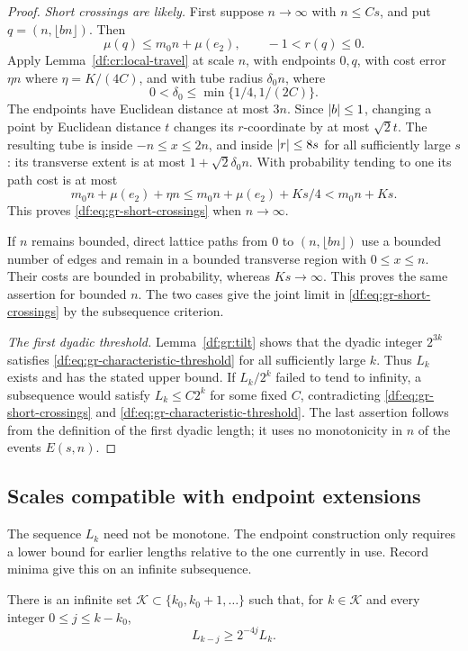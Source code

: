\begin{proof}
\emph{Short crossings are likely.}
First suppose $n\to\infty$ with $n\leq Cs$, and put
$q=(n,\lfloor bn\rfloor)$. Then
\[
 \mu(q)\leq m_0n+\mu(e_2),\qquad -1<r(q)\leq0.
\]
Apply Lemma~\ref{df:cr:local-travel} at scale $n$, with endpoints $0,q$,
with cost error $\eta n$ where $\eta=K/(4C)$, and with tube radius
$\delta_0n$, where
\[
 0<\delta_0\leq\min\{1/4,1/(2C)\}.
\]
The endpoints have Euclidean distance at most $3n$. Since
$\left\lvert b\right\rvert\leq1$, changing a point by Euclidean distance $t$ changes its
$r$-coordinate by at most $\sqrt2t$. The resulting tube is inside
$-n\leq x\leq2n$, and inside $\left\lvert r\right\rvert\leq8s$ for all sufficiently large
$s$: its transverse extent is at most $1+\sqrt2\delta_0n$. With
probability tending to one its path cost is at most
\[
 m_0n+\mu(e_2)+\eta n
 \leq m_0n+\mu(e_2)+Ks/4
 <m_0n+Ks.
\]
This proves \eqref{df:eq:gr-short-crossings} when $n\to\infty$.

If $n$ remains bounded, direct lattice paths from $0$ to
$(n,\lfloor bn\rfloor)$ use a bounded number of edges and remain in a
bounded transverse region with $0\leq x\leq n$. Their costs are bounded
in probability, whereas $Ks\to\infty$. This proves the same assertion
for bounded $n$. The two cases give the joint limit in
\eqref{df:eq:gr-short-crossings} by the subsequence criterion.

\emph{The first dyadic threshold.}
Lemma~\ref{df:gr:tilt} shows that the dyadic integer $2^{3k}$ satisfies
\eqref{df:eq:gr-characteristic-threshold} for all sufficiently large $k$.
Thus $L_k$ exists and has the stated upper bound. If $L_k/2^k$ failed to
tend to infinity, a subsequence would satisfy $L_k\leq C2^k$ for some
fixed $C$, contradicting \eqref{df:eq:gr-short-crossings} and
\eqref{df:eq:gr-characteristic-threshold}. The last assertion follows from
the definition of the first dyadic length; it uses no monotonicity in
$n$ of the events $E(s,n)$.
\end{proof}

\subsection{Scales compatible with endpoint extensions}

The sequence $L_k$ need not be monotone. The endpoint construction
only requires a lower bound for earlier lengths relative to the one
currently in use. Record minima give this on an infinite subsequence.

\begin{lemma}\label{df:gr:record-scales}
There is an infinite set $\mathcal K\subset\{k_0,k_0+1,\ldots\}$ such that,
for $k\in\mathcal K$ and every integer $0\leq j\leq k-k_0$,
\begin{equation}\label{df:eq:gr-record-comparison}
 L_{k-j}\geq2^{-4j}L_k.
\end{equation}
\end{lemma}


